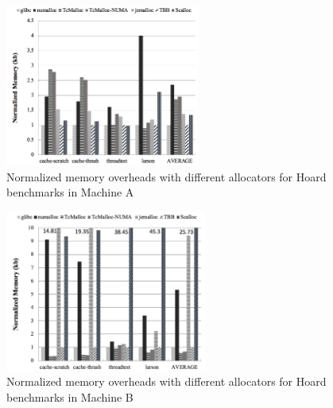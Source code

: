 \begin{figure}[H]
    \centering
    \includegraphics[width=\textwidth,height=200]{figure/2-node-hoard-mem.png}
    \caption{Normalized memory overheads with different allocators for Hoard benchmarks in Machine A}
    \label{2node-hoard-mem}
\end{figure}

\begin{figure}[H]
    \centering
    \includegraphics[width=\textwidth,height=200]{figure/8-node-hoard-mem.png}
    \caption{Normalized memory overheads with different allocators for Hoard benchmarks in Machine B}
    \label{8node-hoard-mem}
\end{figure}

